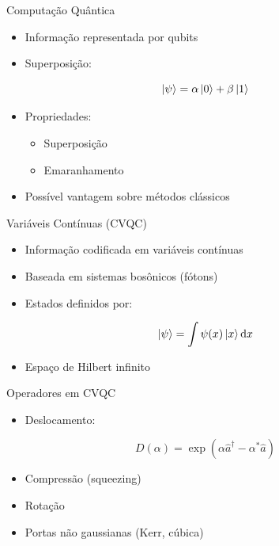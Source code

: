 \documentclass{beamer}
\begin{document}

\begin{frame}{Computação Quântica}
\begin{itemize}
    \item Informação representada por qubits
    \item Superposição:
\end{itemize}

$$
\ket{\psi} = \alpha \ket{0} + \beta \ket{1}
$$

\begin{itemize}
    \item Propriedades:
    \begin{itemize}
        \item Superposição
        \item Emaranhamento
    \end{itemize}
    \item Possível vantagem sobre métodos clássicos
\end{itemize}
\end{frame}


\begin{frame}{Variáveis Contínuas (CVQC)}
\begin{itemize}
    \item Informação codificada em variáveis contínuas
    \item Baseada em sistemas bosônicos (fótons)
    \item Estados definidos por:
\end{itemize}

\[
\ket{\psi} = \int \psi(x)\ket{x} \text{d}x
\]

\begin{itemize}
    \item Espaço de Hilbert infinito
\end{itemize}
\end{frame}


\begin{frame}{Operadores em CVQC}
\begin{itemize}
    \item Deslocamento:
\end{itemize}

\[
D(\alpha) = \exp(\alpha \hat{a}^\dagger - \alpha^* \hat{a})
\]

\begin{itemize}
    \item Compressão (squeezing)
    \item Rotação
    \item Portas não gaussianas (Kerr, cúbica)
\end{itemize}
\end{frame}
\end{document}
